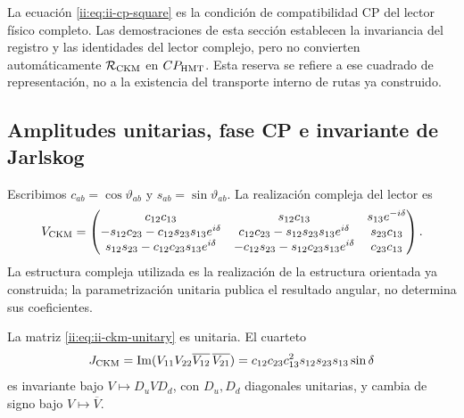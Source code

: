 \begin{remark}
La ecuación \eqref{ii:eq:ii-cp-square} es la condición de
compatibilidad CP del lector físico completo.
Las demostraciones de esta sección establecen la invariancia del
registro y las identidades del lector complejo, pero no convierten
automáticamente \(\mathcal R_{\rm CKM}\) en \(CP_{\rm HMT}\).
Esta reserva se refiere a ese cuadrado de representación, no a la
existencia del transporte interno de rutas ya construido.
\end{remark}

\subsection{Amplitudes unitarias, fase CP e invariante de Jarlskog}

Escribimos \(c_{ab}=\cos\vartheta_{ab}\) y
\(s_{ab}=\sin\vartheta_{ab}\). La realización compleja del lector es
\begingroup
\small
\setlength{\arraycolsep}{3pt}
\begin{equation}
 V_{\rm CKM}=
 \begin{pmatrix}
 c_{12}c_{13}&s_{12}c_{13}&s_{13}e^{-i\delta}\\
 -s_{12}c_{23}-c_{12}s_{23}s_{13}e^{i\delta}&
 c_{12}c_{23}-s_{12}s_{23}s_{13}e^{i\delta}&s_{23}c_{13}\\
 s_{12}s_{23}-c_{12}c_{23}s_{13}e^{i\delta}&
 -c_{12}s_{23}-s_{12}c_{23}s_{13}e^{i\delta}&c_{23}c_{13}
 \end{pmatrix}.
 \label{ii:eq:ii-ckm-unitary}
\end{equation}
\endgroup
La estructura compleja utilizada es la realización de la estructura
orientada ya construida; la parametrización unitaria publica el resultado
angular, no determina sus coeficientes.

\begin{proposition}
La matriz \eqref{ii:eq:ii-ckm-unitary} es unitaria. El cuarteto
\begin{equation}
 J_{\rm CKM}
 =\operatorname{Im}
   (V_{11}V_{22}\overline{V_{12}}\,\overline{V_{21}})
 =c_{12}c_{23}c_{13}^2s_{12}s_{23}s_{13}\sin\delta
 \label{ii:eq:ii-jarlskog}
\end{equation}
es invariante bajo \(V\mapsto D_uVD_d\), con \(D_u,D_d\) diagonales
unitarias, y cambia de signo bajo \(V\mapsto\overline V\).
\end{proposition}

